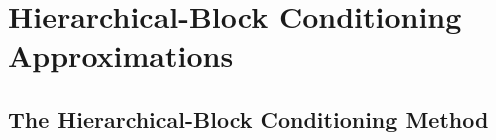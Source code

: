 
\section{Hierarchical-Block Conditioning Approximations}

\subsection{The Hierarchical-Block Conditioning Method}